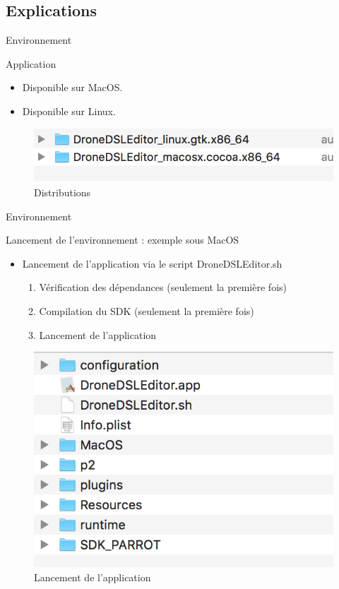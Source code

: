 \documentclass{bredelebeamer}
\begin{document}
	\subsection{Explications}
\begin{frame}{Environnement}
\begin{block}{Application}
\begin{itemize}
\item Disponible sur MacOS.
\item Disponible sur Linux.
\end{itemize}
\end{block}\pause
\begin{figure}
\centering
\includegraphics[scale=0.7]{images/Distrib.png}
\caption{Distributions}
\end{figure}
\end{frame}
    
\begin{frame}{Environnement}
\begin{block}{Lancement de l'environnement : exemple sous MacOS}
\begin{itemize}
\item Lancement de l'application via le script DroneDSLEditor.sh \pause
\begin{enumerate}
\item Vérification des dépendances (seulement la première fois)\pause
\item Compilation du SDK (seulement la première fois)\pause
\item Lancement de l'application\pause
\end{enumerate}
\end{itemize}
\end{block}
\begin{figure}
\centering
\includegraphics[scale=0.3]{images/Contenu.png}
\caption{Lancement de l'application}
\end{figure}
\end{frame}
\end{document}
